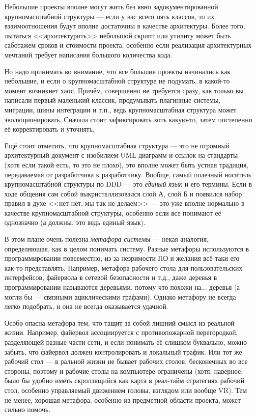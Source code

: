 \documentclass[a5paper]{article}
\begin{document}
Небольшие проекты вполне могут жить без явно задокументированной крупномасштабной структуры --- если у вас всего пять классов, то их взаимоотношения будут вполне достаточны в качестве архитектуры. Более того, пытаться <<архитектурить>> небольшой скрипт или утилиту может быть саботажем сроков и стоимости проекта, особенно если реализация архитектурных мечтаний требует написания большого количества кода. 

Но надо принимать во внимание, что все большие проекты начинались как небольшие, и если о крупномасштабной структуре не подумать, в какой-то момент возникнет хаос. Причём, совершенно не требуется сразу, как только вы написали первый маленький классик, продумывать плагинные системы, миграции, шины интеграции и т.п., ведь крупномасштабная структура может эволюционировать. Сначала стоит зафиксировать хоть какую-то, затем постепенно её корректировать и уточнять.

Ещё стоит отметить, что крупномасштабная структура --- это не огромный архитектурный документ с изобилием UML-диаграмм и ссылок на стандарты (хотя если такой есть, то это не плохо), это вполне может быть устная традиция, передаваемая от разработчика к разработчику. Вообще, самый полезный носитель крупномасштабной структуры по DDD --- это \textit{единый язык} и его термины. Если в ходе общения сам собой выкристаллизовался слой А, слой Б и появился набор правил в духе <<нет-нет, мы так не делаем>> --- это уже вполне нормально в качестве крупномасштабной структуры, особенно если все понимают её однозначно (а должны, это ведь единый язык).

В этом плане очень полезна \textit{метафора системы} --- некая аналогия, определяющая, как в целом понимать систему. Разные метафоры используются в программировании повсеместно, из-за незримости ПО и желания всё-таки его как-то представлять. Например, метафора рабочего стола для пользовательских интерфейсов, файервола в сетевой безопасности и т.д., даже деревья в программировании называются деревьями, потому что похожи на... деревья (а могли бы --- связными ациклическими графами). Однако метафору не всегда легко подобрать, и она не всегда оказывается удачной. 

Особо опасна метафора тем, что тащит за собой лишний смысл из реальной жизни. Например, файервол ассоциируется с противопожарной перегородкой, разделяющей разные части сети, и если понимать её слишком буквально, можно забыть, что файервол должен контролировать и локальный трафик. Или тот же рабочий стол --- в ральной жизни не бывает рабочих столов, бесконечных во все стороны, поэтому и рабочие столы на компьютере ограничены (хотя, наверное, было бы удобно иметь скроллящийся как карта в реал-тайм стратегиях рабочий стол, особенно управляемый движением головы, взглядом или вообще VR). Тем не менее, хорошая метафора, особенно из предметной области проекта, может сильно помочь.
\end{document}
